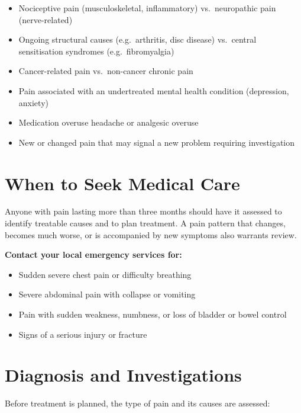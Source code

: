 \begin{itemize}
    \item Nociceptive pain (musculoskeletal, inflammatory) vs.\ neuropathic pain (nerve-related)
    \item Ongoing structural causes (e.g.\ arthritis, disc disease) vs.\ central sensitisation syndromes (e.g.\ fibromyalgia)
    \item Cancer-related pain vs.\ non-cancer chronic pain
    \item Pain associated with an undertreated mental health condition (depression, anxiety)
    \item Medication overuse headache or analgesic overuse
    \item New or changed pain that may signal a new problem requiring investigation
\end{itemize}

\section*{When to Seek Medical Care}
Anyone with pain lasting more than three months should have it assessed to identify treatable causes and to plan treatment. A pain pattern that changes, becomes much worse, or is accompanied by new symptoms also warrants review.

\textbf{Contact your local emergency services for:}
\begin{itemize}
    \item Sudden severe chest pain or difficulty breathing
    \item Severe abdominal pain with collapse or vomiting
    \item Pain with sudden weakness, numbness, or loss of bladder or bowel control
    \item Signs of a serious injury or fracture
\end{itemize}

\section*{Diagnosis and Investigations}
Before treatment is planned, the type of pain and its causes are assessed:

